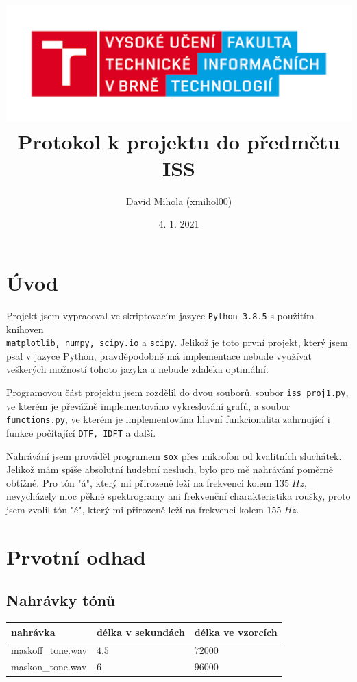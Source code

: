 \documentclass[12pt]{article}
\title{
\includegraphics[scale=0.7]{logo.png}\\
\Huge{Protokol k projektu do předmětu ISS}
}
\author{David Mihola (xmihol00)}
\date{4. 1. 2021}
\begin{document}
\pagecolor{white}
	\maketitle
	\thispagestyle{empty}
	\newpage
\section*{Úvod}
\hspace{1.5em}Projekt jsem vypracoval ve skriptovacím jazyce \texttt{Python 3.8.5} s použitím knihoven\\ \texttt{matplotlib, numpy, scipy.io} a \texttt{scipy}. Jelikož je toto první projekt, který jsem psal v jazyce Python, pravděpodobně má implementace nebude využívat veškerých možností tohoto jazyka a nebude zdaleka optimální.

\hspace{1.5em}Programovou část projektu jsem rozdělil do dvou souborů, soubor \texttt{iss\_proj1.py}, ve kterém je převážně implementováno vykreslování grafů, a soubor \texttt{functions.py}, ve kterém je implementována hlavní funkcionalita zahrnující i funkce počítající \texttt{DTF, IDFT} a další.

\hspace{1.5em}Nahrávání jsem prováděl programem \texttt{sox} přes mikrofon od kvalitních sluchátek. Jelikož mám spíše absolutní hudební nesluch, bylo pro mě nahrávání poměrně obtížné. Pro tón "á", který mi přirozeně leží na frekvenci kolem $135\; Hz$, nevycházely moc pěkné spektrogramy ani frekvenční charakteristika roušky, proto jsem zvolil tón "é", který mi přirozeně leží na frekvenci kolem $155\; Hz$.
\section*{Prvotní odhad}
\subsection{Nahrávky tónů}
\begin{center}
\begin{tabular}{| m{} | m{} | m{} |} 
\hline
\textbf{nahrávka} & \textbf{délka v sekundách} & \textbf{délka ve vzorcích}\\
\hline
maskoff\_tone.wav & $4.5$ & $72000$ \\ 
maskon\_tone.wav & $6$ & $96000$\\ 
\hline
\end{tabular}
\end{center}
\end{document}
